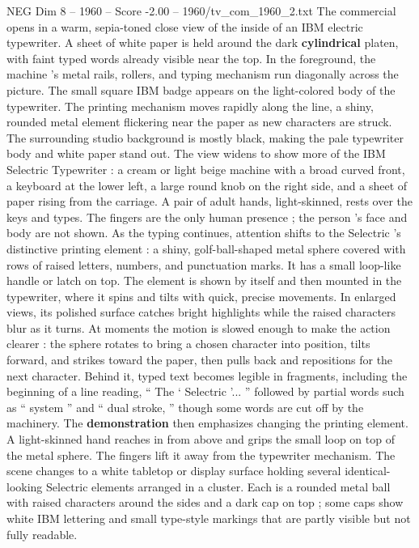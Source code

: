 \begin{textsample}{NEG Dim 8 – 1960 – Score -2.00 – 1960/tv\_com\_1960\_2.txt}  \label{ex:f8_neg_008}
The commercial opens in a warm, sepia-toned close view of the inside of an IBM electric typewriter.
A sheet of white paper is held around the dark \textbf{cylindrical} platen, with faint typed words already visible near the top.
In the foreground, the machine ’s metal rails, rollers, and typing mechanism run diagonally across the picture.
The small square IBM badge appears on the light-colored body of the typewriter.
The printing mechanism moves rapidly along the line, a shiny, rounded metal element flickering near the paper as new characters are struck.
The surrounding studio background is mostly black, making the pale typewriter body and white paper stand out.
The view widens to show more of the IBM Selectric Typewriter : a cream or light beige machine with a broad curved front, a keyboard at the lower left, a large round knob on the right side, and a sheet of paper rising from the carriage.
A pair of adult hands, light-skinned, rests over the keys and types.
The fingers are the only human presence ; the person ’s face and body are not shown.
As the typing continues, attention shifts to the Selectric ’s distinctive printing element : a shiny, golf-ball-shaped metal sphere covered with rows of raised letters, numbers, and punctuation marks.
It has a small loop-like handle or latch on top.
The element is shown by itself and then mounted in the typewriter, where it spins and tilts with quick, precise movements.
In enlarged views, its polished surface catches bright highlights while the raised characters blur as it turns.
At moments the motion is slowed enough to make the action clearer : the sphere rotates to bring a chosen character into position, tilts forward, and strikes toward the paper, then pulls back and repositions for the next character.
Behind it, typed text becomes legible in fragments, including the beginning of a line reading, “ The ‘ Selectric ’... ” followed by partial words such as “ system ” and “ dual stroke, ” though some words are cut off by the machinery.
The \textbf{demonstration} then emphasizes changing the printing element.
A light-skinned hand reaches in from above and grips the small loop on top of the metal sphere.
The fingers lift it away from the typewriter mechanism.
The scene changes to a white tabletop or display surface holding several identical-looking Selectric elements arranged in a cluster.
Each is a rounded metal ball with raised characters around the sides and a dark cap on top ; some caps show white IBM lettering and small type-style markings that are partly visible but not fully readable.

\end{textsample}
